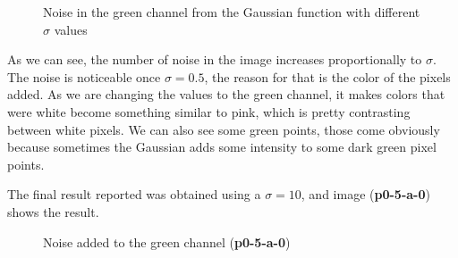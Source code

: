 \documentclass[12pt,a4paper]{article}
\begin{document}
\begin{figure}[!h]
	\caption{Noise in the green channel from the Gaussian function with different $\sigma$ values}%
	\label{fig:green-sigma}%
\end{figure}

As we can see, the number of noise in the image increases proportionally to $\sigma$. The noise is noticeable once $\sigma = 0.5$, the reason for that is the color of the pixels added. As we are changing the values to the green channel, it makes colors that were white become something similar to pink, which is pretty contrasting between white pixels. We can also see some green points, those come obviously because sometimes the Gaussian adds some intensity to some dark green pixel points.

The final result reported was obtained using a  $\sigma = 10$, and image (\textbf{p0-5-a-0}) shows the result.

\begin{figure}[!h]
	\centering
	{%
		\setlength{\fboxsep}{1pt}%
		\setlength{\fboxrule}{1pt}%
	}%
	\caption{Noise added to the green channel (\textbf{p0-5-a-0})}
	\label{fig:p0-5-a-0}
\end{figure}
\end{document}
